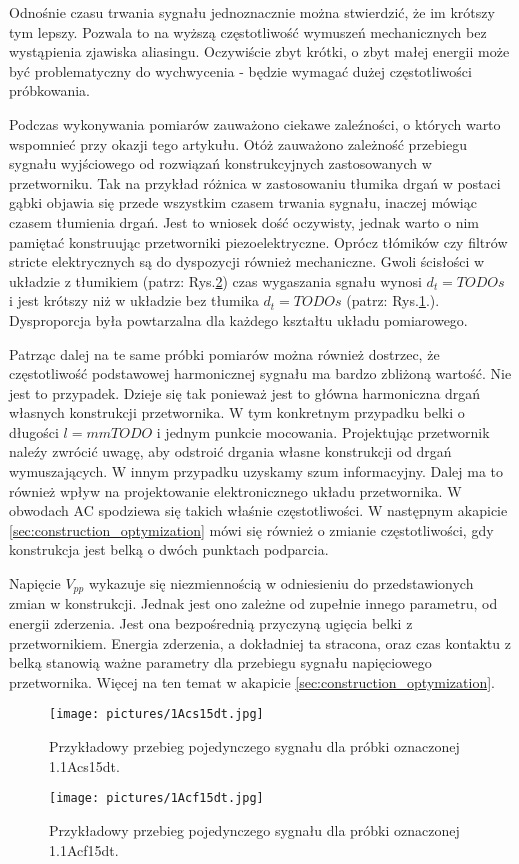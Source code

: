 \indent Odnośnie czasu trwania sygnału jednoznacznie można stwierdzić, że im krótszy tym 
lepszy. Pozwala to na wyższą częstotliwość wymuszeń mechanicznych bez wystąpienia zjawiska 
aliasingu. Oczywiście zbyt krótki, o zbyt małej energii może być problematyczny do 
wychwycenia - będzie wymagać dużej częstotliwości próbkowania.

\indent Podczas wykonywania pomiarów zauważono ciekawe zaleźności, o których warto wspomnieć
 przy okazji tego artykułu. Otóż zauważono zależność przebiegu sygnału wyjściowego od 
 rozwiązań konstrukcyjnych zastosowanych w przetworniku. Tak na przykład różnica w 
 zastosowaniu tłumika drgań w postaci gąbki objawia się przede wszystkim czasem trwania 
 sygnału, inaczej mówiąc czasem tłumienia drgań. Jest to wniosek dość oczywisty, jednak 
 warto o nim pamiętać konstruując przetworniki piezoelektryczne. Oprócz tłómików czy 
 filtrów stricte elektrycznych są do dyspozycji również mechaniczne. Gwoli ścisłości w 
 układzie z tłumikiem (patrz: Rys.\ref{fig:scope_with_silencer}) czas wygaszania sgnału 
 wynosi $d_t = TODOs$ i jest krótszy niż w układzie bez tłumika 
 $d_t = TODOs$ (patrz: Rys.\ref{fig:scope_without_silencer}.). 
 Dysproporcja była powtarzalna dla każdego kształtu układu pomiarowego.

\indent Patrząc dalej na te same próbki pomiarów można również dostrzec, że częstotliwość 
podstawowej harmonicznej sygnału ma bardzo zbliżoną wartość. Nie jest to przypadek. 
Dzieje się tak ponieważ jest to główna harmoniczna drgań własnych konstrukcji przetwornika. 
W tym konkretnym przypadku belki o długości $l = mmTODO$ i jednym punkcie mocowania. 
Projektując przetwornik naleźy zwrócić uwagę, aby odstroić drgania własne konstrukcji 
od drgań wymuszających. W innym przypadku uzyskamy szum informacyjny. Dalej ma to również 
wpływ na projektowanie elektronicznego układu przetwornika. W obwodach AC spodziewa się 
takich właśnie częstotliwości. W następnym akapicie \ref{sec:construction_optymization} 
mówi się również o zmianie częstotliwości, gdy konstrukcja jest belką o dwóch punktach 
podparcia. 

Napięcie $V_{pp}$ wykazuje się niezmiennością w odniesieniu do przedstawionych zmian 
w konstrukcji. Jednak jest ono zależne od zupełnie innego parametru, od energii zderzenia. 
Jest ona bezpośrednią przyczyną ugięcia belki z przetwornikiem. Energia zderzenia, 
a dokładniej ta stracona, oraz czas kontaktu z belką stanowią ważne parametry 
dla przebiegu sygnału napięciowego przetwornika. Więcej na ten temat w 
akapicie \ref{sec:construction_optymization}.

\begin{figure}[htbp]
\centering
\texttt{[image: pictures/1Acs15dt.jpg]}
\caption{Przykładowy przebieg pojedynczego sygnału dla próbki oznaczonej 1.1Acs15dt.}
\label{fig:scope_without_silencer}
\end{figure}

\begin{figure}[htbp]
\centering
\texttt{[image: pictures/1Acf15dt.jpg]}
\caption{Przykładowy przebieg pojedynczego sygnału dla próbki oznaczonej 1.1Acf15dt.}
\label{fig:scope_with_silencer}
\end{figure}
